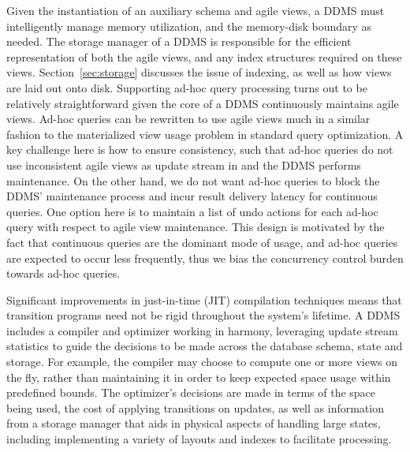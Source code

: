 Given the instantiation of an auxiliary schema and agile views, a DDMS must
intelligently manage memory utilization, and the memory-disk boundary as needed. The
storage manager of a DDMS is responsible for the efficient representation of
both the agile views, and any index structures required on these views.
Section~\ref{sec:storage} discusses the issue of indexing, as well as how views
are laid out onto disk. Supporting ad-hoc query processing turns out to be
relatively straightforward given the core of a DDMS continuously maintains agile
views. Ad-hoc queries can be rewritten to use agile views much in a similar
fashion to the materialized view usage problem in standard query optimization. A
key challenge here is how to ensure consistency, such that ad-hoc queries do not
use inconsistent agile views as update stream in and the DDMS performs
maintenance. On the other hand, we do not want ad-hoc queries to block the DDMS'
maintenance process and incur result delivery latency for continuous queries.
One option here is to maintain a list of undo actions for each ad-hoc query with
respect to agile view maintenance. This design is motivated by the fact that
continuous queries are the dominant mode of usage, and ad-hoc queries are
expected to occur less frequently, thus we bias the concurrency control burden
towards ad-hoc queries.






Significant improvements in just-in-time (JIT) compilation techniques means that
transition programs need not be rigid throughout the system's lifetime. A DDMS
includes a compiler and optimizer working in harmony, leveraging update stream
statistics to guide the decisions to be made across the database schema, state
and storage. For example, the compiler may choose to compute one or more views
on the fly, rather than maintaining it in order to keep expected space usage
within predefined bounds. The optimizer's decisions are made in terms of the
space being used, the cost of applying transitions on updates, as well as
information from a storage manager that aids in physical aspects of handling
large states, including implementing a variety of layouts and indexes to
facilitate processing.










